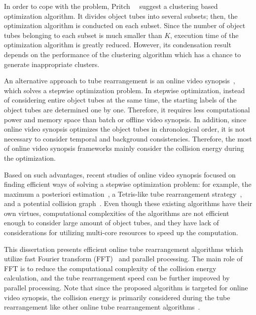 \documentclass[11pt]{hyu_thesis}
\begin{document}
In order to cope with the problem, Pritch~\etal~\cite{Pritch2009} suggest
a clustering based optimization algorithm. It divides object tubes into several subsets; then, the optimization algorithm is conducted on each subset. Since the number of object tubes belonging to each subset is much smaller than $K$, execution time of the optimization algorithm is greatly reduced. However, its condensation result depends on the performance of the clustering algorithm which has a chance to
generate inappropriate clusters.

An alternative approach to tube rearrangement is an online video synopsis~\cite{Feng2012,Huang2014,Fu2014,Zhu2015,He2017,He2017a}, which solves a stepwise optimization problem. In stepwise optimization, instead of considering entire object tubes at the same time, the starting labels of the object tubes are determined one by one. Therefore, it requires less computational power and memory space than batch or offline video synopsis. In addition, since online video synopsis optimizes the object tubes in chronological order, it is not necessary to consider temporal and background consistencies. Therefore, the most of online video synopsis frameworks mainly consider the collision energy during the optimization.

Based on such advantages, recent studies of online video synopsis focused on finding efficient ways of solving a stepwise optimization problem: for example, the maximum a posteriori estimation~\cite{Huang2014}, a Tetris-like tube rearrangement strategy~\cite{Feng2012,Zhu2015}, and a potential collision graph~\cite{He2017,He2017a}. Even though these existing algorithms have their own virtues, computational complexities of the algorithms are not efficient enough to consider large amount of object tubes, and they have lack of considerations for utilizing multi-core resources to speed up the computation.

This dissertation presents efficient online tube rearrangement algorithms which utilize fast Fourier transform (FFT)~\cite{Oppenheim2009} and parallel processing. The main role of FFT is to reduce the computational complexity of the collision energy calculation, and the tube rearrangement speed can be further improved by parallel processing. Note that since the proposed algorithm is targeted for online video synopsis, the collision energy is primarily considered during the tube rearrangement like other online tube rearrangement algorithms~\cite{Feng2012,Huang2014,Fu2014,Zhu2015,He2017,He2017a}. 
\end{document}
